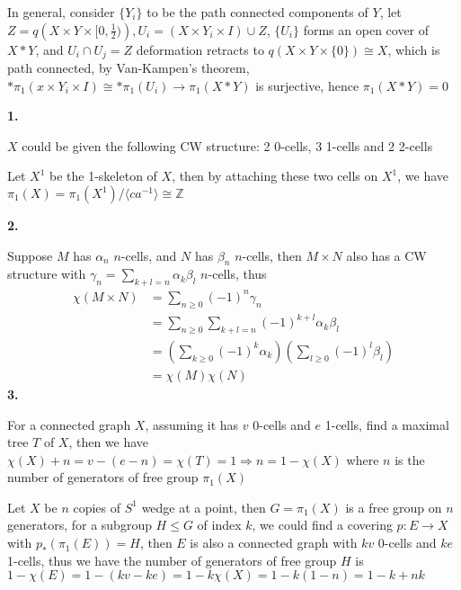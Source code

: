 \documentclass[../main.tex]{subfiles}
\begin{document}
In general, consider $\{Y_i\}$ to be the path connected components of $Y$, let $Z=q\left(X\times Y\times [0,\frac{1}{2})\right), U_i=(X\times Y_i\times I)\cup Z$, $\{U_i\}$ forms an open cover of $X*Y$, and $U_i\cap U_j=Z$ deformation retracts to $q(X\times Y\times \{0\})\cong X$, which is path connected, by Van-Kampen's theorem, $*\pi_1(x\times Y_i\times I)\cong *\pi_1(U_i)\rightarrow \pi_1(X*Y)$ is surjective, hence $\pi_1(X*Y)=0$ \par
\textbf{1.} \par
$X$ could be given the following CW structure: 2 0-cells, 3 1-cells and 2 2-cells \par
\vspace{1.5cm}
Let $X^1$ be the 1-skeleton of $X$, then by attaching these two cells on $X^1$, we have $\pi_1(X)=\pi_1(X^1)/\langle ca^{-1}\rangle\cong \mathbb{Z}$ \par

\textbf{2.} \par
Suppose $M$ has $\alpha_n$ $n$-cells, and $N$ has $\beta_n$ $n$-cells, then $M\times N$ also has a CW structure with $\displaystyle\gamma_n=\sum_{k+l=n}\alpha_k\beta_l$ $n$-cells, thus
\[
\begin{aligned}
\chi(M\times N)
&=\sum_{n\geq 0}(-1)^n\gamma_n \\
&=\sum_{n\geq 0}\sum_{k+l=n}(-1)^{k+l}\alpha_k\beta_l \\
&=\left(\sum_{k\geq 0}(-1)^k\alpha_k\right)\left(\sum_{l\geq 0}(-1)^l\beta_l\right) \\
&=\chi(M)\chi(N)
\end{aligned}
\]
\textbf{3.} \par
For a connected graph $X$, assuming it has $v$ 0-cells and $e$ 1-cells, find a maximal tree $T$ of $X$, then we have $\chi(X)+n=v-(e-n)=\chi(T)=1\Rightarrow n=1-\chi(X)$ where $n$ is the number of generators of free group $\pi_1(X)$ \par
Let $X$ be $n$ copies of $S^1$ wedge at a point, then $G=\pi_1(X)$ is a free group on $n$ generators, for a subgroup $H\leq G$ of index $k$, we could find a covering $p:E\rightarrow X$ with $p_*(\pi_1(E))=H$, then $E$ is also a connected graph with $kv$ 0-cells and $ke$ 1-cells, thus we have the number of generators of free group $H$ is $1-\chi(E)=1-(kv-ke)=1-k\chi(X)=1-k(1-n)=1-k+nk$ \par
\end{document}
